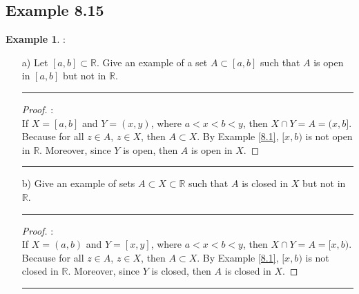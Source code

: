 \documentclass[openany, amssymb, psamsfonts]{amsart}
\newcommand{\bbR}{\mathbb{R}}
\theoremstyle{definition}
\newtheorem{exmp}{Example}[section]
\numberwithin{equation}{section}
\begin{document}
\subsection*{Example 8.15}
\begin{exmp}
\renewcommand{\theenumi}{\alph{enumi}}:\\
\begin{enumerate}
\item[a)] Let $[a,b]\subset \bbR$. Give an example of a set $A\subset [a,b]$ such that $A$ is open in $[a,b]$ but not in $\bbR$.
\vspace{4pt}     \hrule   \vspace{4pt} \begin {proof}:\\
If $X = [a,b]$ and $Y = (x,y)$, where $a<x<b<y$, then $X\cap Y = A = (x,b]$. Because for all $z\in A$, $z\in X$, then $A\subset X$. By Example \ref{8.1}, $[x,b)$ is not open in $\bbR$. Moreover, since $Y$ is open, then $A$ is open in $X$.
\end{proof}\vspace{4pt}     \hrule   \vspace{4pt} 

\item[b)] Give an example of sets $A\subset X\subset \bbR$ such that $A$ is closed in $X$ but not in $\bbR$. 
\vspace{4pt}     \hrule   \vspace{4pt} \begin {proof}:\\
If $X = (a,b)$ and $Y = [x,y]$, where $a<x<b<y$, then $X\cap Y = A = [x,b)$. Because for all $z\in A$, $z\in X$, then $A\subset X$. By Example \ref{8.1}, $[x,b)$ is not closed in $\bbR$. Moreover, since $Y$ is closed, then $A$ is closed in $X$.
\end{proof}\vspace{4pt}     \hrule   \vspace{4pt} 
\end{enumerate}
\end{exmp}
\end{document}
